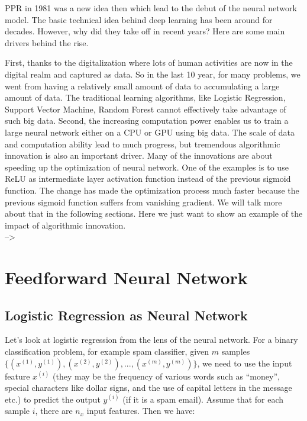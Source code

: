 \documentclass[
  12pt,
]{krantz}
\begin{document}
PPR in 1981 was a new idea then which lead to the debut of the neural network model. The basic technical idea behind deep learning has been around for decades. However, why did they take off in recent years? Here are some main drivers behind the rise.

First, thanks to the digitalization where lots of human activities are now in the digital realm and captured as data. So in the last 10 year, for many problems, we went from having a relatively small amount of data to accumulating a large amount of data. The traditional learning algorithms, like Logistic Regression, Support Vector Machine, Random Forest cannot effectively take advantage of such big data. Second, the increasing computation power enables us to train a large neural network either on a CPU or GPU using big data. The scale of data and computation ability lead to much progress, but tremendous algorithmic innovation is also an important driver. Many of the innovations are about speeding up the optimization of neural network. One of the examples is to use ReLU as intermediate layer activation function instead of the previous sigmoid function. The change has made the optimization process much faster because the previous sigmoid function suffers from vanishing gradient. We will talk more about that in the following sections. Here we just want to show an example of the impact of algorithmic innovation.\\
--\textgreater{}

\hypertarget{feedforward-neural-network}{%
\section{Feedforward Neural Network}\label{feedforward-neural-network}}

\hypertarget{logisticregasneuralnetwork}{%
\subsection{Logistic Regression as Neural Network}\label{logisticregasneuralnetwork}}

Let's look at logistic regression from the lens of the neural network. For a binary classification problem, for example spam classifier, given \(m\) samples \(\{(x^{(1)}, y^{(1)}),(x^{(2)}, y^{(2)}),...,(x^{(m)}, y^{(m)})\}\), we need to use the input feature \(x^{(i)}\) (they may be the frequency of various words such as ``money'', special characters like dollar signs, and the use of capital letters in the message etc.) to predict the output \(y^{(i)}\) (if it is a spam email). Assume that for each sample \(i\), there are \(n_{x}\) input features. Then we have:
\end{document}
